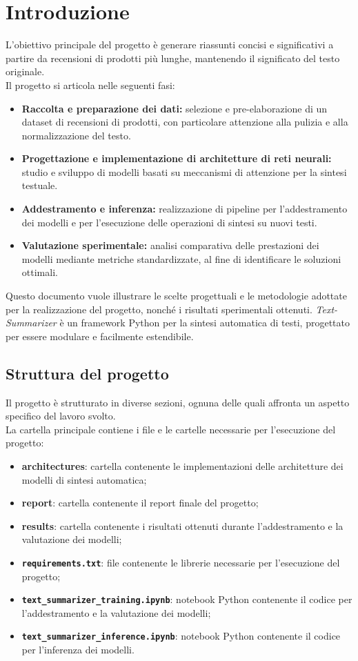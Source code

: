 \section{Introduzione}
L'obiettivo principale del progetto è generare riassunti concisi e significativi a partire da recensioni di prodotti più lunghe, mantenendo il significato del testo originale.\\
Il progetto si articola nelle seguenti fasi:
\begin{itemize}
    \item \textbf{Raccolta e preparazione dei dati:} selezione e pre-elaborazione di un dataset di recensioni di prodotti, con particolare attenzione alla pulizia e alla normalizzazione del testo.
    \item \textbf{Progettazione e implementazione di architetture di reti neurali:} studio e sviluppo di modelli basati su meccanismi di attenzione per la sintesi testuale.
    \item \textbf{Addestramento e inferenza:} realizzazione di pipeline per l'addestramento dei modelli e per l'esecuzione delle operazioni di sintesi su nuovi testi.
    \item \textbf{Valutazione sperimentale:} analisi comparativa delle prestazioni dei modelli mediante metriche standardizzate, al fine di identificare le soluzioni ottimali.
\end{itemize}
Questo documento vuole illustrare le scelte progettuali e le metodologie adottate per la realizzazione del progetto, nonché i risultati sperimentali ottenuti.
\textit{Text-Summarizer} è un framework Python per la sintesi automatica di testi, progettato per essere modulare e facilmente estendibile.

\subsection{Struttura del progetto}
Il progetto è strutturato in diverse sezioni, ognuna delle quali affronta un aspetto specifico del lavoro svolto.\\
La cartella principale contiene i file e le cartelle necessarie per l'esecuzione del progetto:
\begin{itemize}
    \item \textbf{architectures}: cartella contenente le implementazioni delle architetture dei modelli di sintesi automatica;
    \item \textbf{report}: cartella contenente il report finale del progetto;
    \item \textbf{results}: cartella contenente i risultati ottenuti durante l'addestramento e la valutazione dei modelli;
    \item \textbf{\texttt{requirements.txt}}: file contenente le librerie necessarie per l'esecuzione del progetto;
    \item \textbf{\texttt{text\_summarizer\_training.ipynb}}: notebook Python contenente il codice per l'addestramento e la valutazione dei modelli;
    \item \textbf{\texttt{text\_summarizer\_inference.ipynb}}: notebook Python contenente il codice per l'inferenza dei modelli.
\end{itemize}
